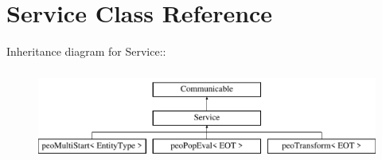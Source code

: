\hypertarget{classService}{
\section{Service Class Reference}
\label{classService}
}
Inheritance diagram for Service::\begin{figure}[H]
\begin{center}
\leavevmode
\includegraphics[height=3cm]{classService}
\end{center}
\end{figure}
